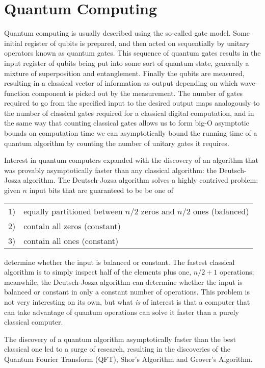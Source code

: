 \section{Quantum Computing}
Quantum computing is usually described using the so-called gate model.\cite{qc}  Some initial register of qubits is prepared, and then acted on sequentially by unitary operators known as quantum gates.  This sequence of quantum gates results in the input register of qubits being put into some sort of quantum state, generally a mixture of superposition and entanglement.  Finally the qubits are measured, resulting in a classical vector of information as output depending on which wave-function component is picked out by the measurement.  The number of gates required to go from the specified input to the desired output maps analogously to the number of classical gates required for a classical digital computation, and in the same way that counting classical gates allows us to form big-O asymptotic bounds on computation time we can asymptotically bound the running time of a quantum algorithm by counting the number of unitary gates it requires.

Interest in quantum computers expanded with the discovery of an algorithm that was provably asymptotically faster than any classical algorithm: the Deutsch-Josza algorithm.\cite{deutsch}  The Deutsch-Jozsa algorithm solves a highly contrived problem: given $n$ input bits that are guaranteed to be be one of

\begin{center}
	\begin{tabular}{l l}
		1) & equally partitioned between $n/2$ zeros and $n/2$ ones (balanced) \\
		2) & contain all zeros (constant) \\
		3) & contain all ones (constant) \\
	\end{tabular}
\end{center}
determine whether the input is balanced or constant.  The fastest classical algorithm is to simply inspect half of the elements plus one, $n/2 + 1$ operations; meanwhile, the Deutsch-Josza algorithm can determine whether the input is balanced or constant in only a constant number of operations.  This problem is not very interesting on its own, but what \emph{is} of interest is that a computer that can take advantage of quantum operations can solve it faster than a purely classical computer.

The discovery of a quantum algorithm asymptotically faster than the best classical one led to a surge of research, resulting in the discoveries of the Quantum Fourier Transform (QFT)\cite{qcbook}, Shor's Algorithm\cite{shor} and Grover's Algorithm\cite{grover}.

